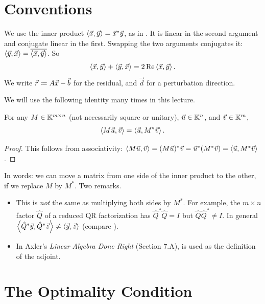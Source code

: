 \section{Conventions}
\label{sec:normal-conventions}

We use the inner product $\left\langle \vec{x}, \vec{y} \right\rangle = \vec{x}^\ast\vec{y}$, as in . It is linear in the second argument and conjugate linear in the first. Swapping the two arguments conjugates it: $\left\langle \vec{y}, \vec{x} \right\rangle = \overline{\left\langle \vec{x}, \vec{y} \right\rangle}$. So
\begin{equation}
  \left\langle \vec{x}, \vec{y} \right\rangle + \left\langle \vec{y}, \vec{x} \right\rangle = 2\operatorname{Re}\left\langle \vec{x}, \vec{y} \right\rangle.
\end{equation}
We write $\vec{r} \coloneqq A\vec{x} - \vec{b}$ for the residual, and $\vec{d}$ for a perturbation direction.

We will use the following identity many times in this lecture.

\begin{lemma}
  \label{lem:adjoint}
  For any $M \in \mathbb{K}^{m \times n}$ (not necessarily square or unitary), $\vec{u} \in \mathbb{K}^n$, and $\vec{v} \in \mathbb{K}^m$,
  \begin{equation}
    \left\langle M\vec{u}, \vec{v} \right\rangle = \left\langle \vec{u}, M^\ast\vec{v} \right\rangle.
  \end{equation}
\end{lemma}

\begin{proof}
  This follows from associativity: $\left\langle M\vec{u}, \vec{v} \right\rangle = (M\vec{u})^\ast\vec{v} = \vec{u}^\ast(M^\ast\vec{v}) = \left\langle \vec{u}, M^\ast\vec{v} \right\rangle$.
\end{proof}

In words: we can move a matrix from one side of the inner product to the other, if we replace $M$ by $M^\ast$. Two remarks.
\begin{itemize}
  \item This is \emph{not} the same as multiplying both sides by $M^\ast$. For example, the $m \times n$ factor $\hat{Q}$ of a reduced QR factorization has $\hat{Q}^\ast\hat{Q} = I$ but $\hat{Q}\hat{Q}^\ast \ne I$. In general $\left\langle \hat{Q}^\ast\vec{y}, \hat{Q}^\ast\vec{z} \right\rangle \ne \left\langle \vec{y}, \vec{z} \right\rangle$ (compare ).
  \item In Axler's \emph{Linear Algebra Done Right} (Section 7.A),  is used as the definition of the adjoint.
\end{itemize}

\section{The Optimality Condition}

